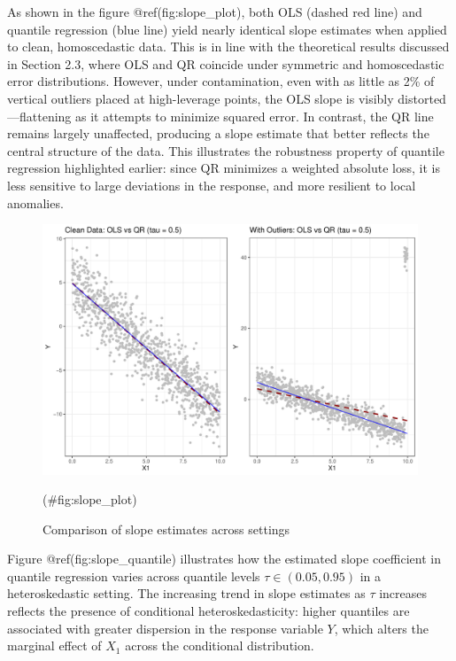 \documentclass[fleqn,10pt]{latex/stylish_article} %
\begin{document}
As shown in the figure @ref(fig:slope\_plot), both OLS (dashed red line) and quantile regression (blue line) yield nearly identical slope estimates when applied to clean, homoscedastic data. This is in line with the theoretical results discussed in Section 2.3, where OLS and QR coincide under symmetric and homoscedastic error distributions. However, under contamination, even with as little as 2\% of vertical outliers placed at high-leverage points, the OLS slope is visibly distorted---flattening as it attempts to minimize squared error. In contrast, the QR line remains largely unaffected, producing a slope estimate that better reflects the central structure of the data. This illustrates the robustness property of quantile regression highlighted earlier: since QR minimizes a weighted absolute loss, it is less sensitive to large deviations in the response, and more resilient to local anomalies.

\begin{figure}

{\centering \includegraphics[width=0.8\linewidth]{ADR_project_draft_files/figure-latex/slope_plot-1} 

}

\caption{Comparison of slope estimates across settings}(\#fig:slope_plot)
\end{figure}

Figure @ref(fig:slope\_quantile) illustrates how the estimated slope coefficient in quantile regression varies across quantile levels \(\tau \in (0.05, 0.95)\) in a heteroskedastic setting. The increasing trend in slope estimates as \(\tau\) increases reflects the presence of conditional heteroskedasticity: higher quantiles are associated with greater dispersion in the response variable \(Y\), which alters the marginal effect of \(X_1\) across the conditional distribution.
\end{document}
